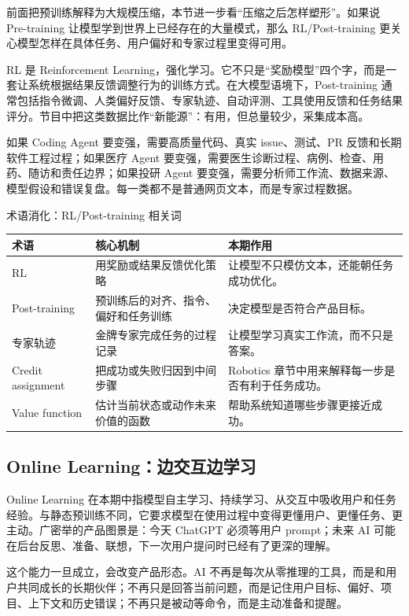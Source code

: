 前面把预训练解释为大规模压缩，本节进一步看“压缩之后怎样塑形”。如果说 Pre-training 让模型学到世界上已经存在的大量模式，那么 RL/Post-training 更关心模型怎样在具体任务、用户偏好和专家过程里变得可用。

RL 是 Reinforcement Learning，强化学习。它不只是“奖励模型”四个字，而是一套让系统根据结果反馈调整行为的训练方式。在大模型语境下，Post-training 通常包括指令微调、人类偏好反馈、专家轨迹、自动评测、工具使用反馈和任务结果评分。节目中把这类数据比作“新能源”：有用，但总量较少，采集成本高。

如果 Coding Agent 要变强，需要高质量代码、真实 issue、测试、PR 反馈和长期软件工程过程；如果医疗 Agent 要变强，需要医生诊断过程、病例、检查、用药、随访和责任边界；如果投研 Agent 要变强，需要分析师工作流、数据来源、模型假设和错误复盘。每一类都不是普通网页文本，而是专家过程数据。

\begin{knowledgebox}{术语消化：RL/Post-training 相关词}
\begin{tabularx}{\textwidth}{p{}p{}X}
\toprule
术语 & 核心机制 & 本期作用 \\
\midrule
RL & 用奖励或结果反馈优化策略 & 让模型不只模仿文本，还能朝任务成功优化。 \\
Post-training & 预训练后的对齐、指令、偏好和任务训练 & 决定模型是否符合产品目标。 \\
专家轨迹 & 金牌专家完成任务的过程记录 & 让模型学习真实工作流，而不只是答案。 \\
Credit assignment & 把成功或失败归因到中间步骤 & Robotics 章节中用来解释每一步是否有利于任务成功。 \\
Value function & 估计当前状态或动作未来价值的函数 & 帮助系统知道哪些步骤更接近成功。 \\
\bottomrule
\end{tabularx}
\end{knowledgebox}

\subsection{Online Learning：边交互边学习}

Online Learning 在本期中指模型自主学习、持续学习、从交互中吸收用户和任务经验。与静态预训练不同，它要求模型在使用过程中变得更懂用户、更懂任务、更主动。广密举的产品图景是：今天 ChatGPT 必须等用户 prompt；未来 AI 可能在后台反思、准备、联想，下一次用户提问时已经有了更深的理解。

这个能力一旦成立，会改变产品形态。AI 不再是每次从零推理的工具，而是和用户共同成长的长期伙伴；不再只是回答当前问题，而是记住用户目标、偏好、项目、上下文和历史错误；不再只是被动等命令，而是主动准备和提醒。

